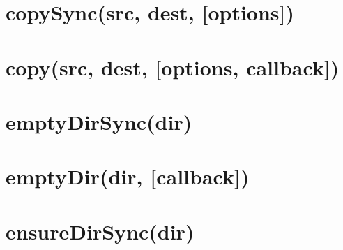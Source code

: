 \documentclass[twoside]{book}
\newcommand{\+}{\discretionary{\mbox{\scriptsize$\hookleftarrow$}}{}{}}
\begin{document}
\chapter{copy\+Sync(src, dest, \mbox{[}options\mbox{]})}
\label{md_dsmacc_examples_DRmerge_node_modules_electron-packager_node_modules_fs-extra_docs_copy-sync}

\chapter{copy(src, dest, \mbox{[}options, callback\mbox{]})}
\label{md_dsmacc_examples_DRmerge_node_modules_electron-packager_node_modules_fs-extra_docs_copy}

\chapter{empty\+Dir\+Sync(dir)}
\label{md_dsmacc_examples_DRmerge_node_modules_electron-packager_node_modules_fs-extra_docs_emptyDir-sync}

\chapter{empty\+Dir(dir, \mbox{[}callback\mbox{]})}
\label{md_dsmacc_examples_DRmerge_node_modules_electron-packager_node_modules_fs-extra_docs_emptyDir}

\chapter{ensure\+Dir\+Sync(dir)}
\label{md_dsmacc_examples_DRmerge_node_modules_electron-packager_node_modules_fs-extra_docs_ensureDir-sync}

\end{document}
